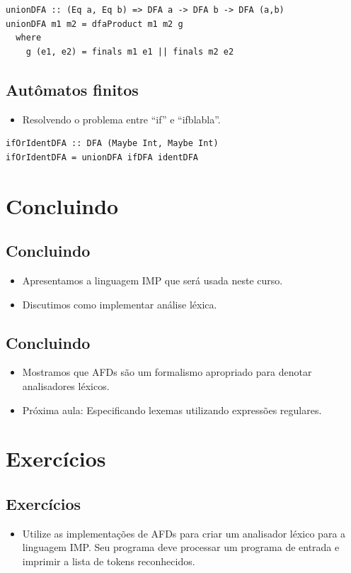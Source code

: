 \documentclass[11pt]{article}
\begin{document}
\begin{verbatim}
unionDFA :: (Eq a, Eq b) => DFA a -> DFA b -> DFA (a,b)
unionDFA m1 m2 = dfaProduct m1 m2 g
  where
    g (e1, e2) = finals m1 e1 || finals m2 e2
\end{verbatim}
\subsection*{Autômatos finitos}
\label{sec:org1c4a74a}

\begin{itemize}
\item Resolvendo o problema entre ``if'' e ``ifblabla''.
\end{itemize}

\begin{verbatim}
ifOrIdentDFA :: DFA (Maybe Int, Maybe Int)
ifOrIdentDFA = unionDFA ifDFA identDFA
\end{verbatim}
\section*{Concluindo}
\label{sec:org5750917}

\subsection*{Concluindo}
\label{sec:org8434d0d}

\begin{itemize}
\item Apresentamos a linguagem IMP que será usada neste curso.

\item Discutimos como implementar análise léxica.
\end{itemize}
\subsection*{Concluindo}
\label{sec:orge2ba5c2}

\begin{itemize}
\item Mostramos que AFDs são um formalismo apropriado para denotar
analisadores léxicos.

\item Próxima aula: Especificando lexemas utilizando expressões regulares.
\end{itemize}
\section*{Exercícios}
\label{sec:org8d4f732}

\subsection*{Exercícios}
\label{sec:orgb4a3b52}

\begin{itemize}
\item Utilize as implementações de AFDs para criar um analisador léxico para a linguagem IMP.
Seu programa deve processar um programa de entrada e imprimir a lista de tokens reconhecidos.
\end{itemize}
\end{document}
